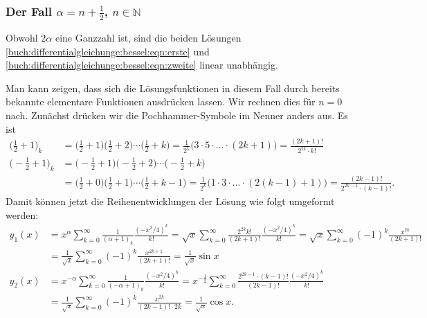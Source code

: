 %
%
\subsubsection{Der Fall $\alpha=n+\frac12$, $n\in\mathbb{N}$}
Obwohl $2\alpha$ eine Ganzzahl ist, sind die beiden Lösungen
\eqref{buch:differentialgleichunge:bessel:eqn:erste}
und
\eqref{buch:differentialgleichunge:bessel:eqn:zweite}
linear unabhängig.

Man kann zeigen, dass sich die Lösungsfunktionen in diesem Fall
durch bereits bekannte elementare Funktionen ausdrücken lassen.
Wir rechnen dies für $n=0$ nach.
Zunächst drücken wir die Pochhammer-Symbole im Nenner anders aus.
Es ist
\begin{align*}
\biggl(\frac12 + 1\biggr)_k
&=
\biggl(\frac12 + 1\biggr)
\biggl(\frac12 + 2\biggr)
\cdots
\biggl(\frac12 + k\biggr)
=
\frac{1}{2^k}\bigl(3\cdot 5\cdot\ldots\cdot (2k+1)\bigr)
=
\frac{(2k+1)!}{2^{2k}\cdot k!}
\\
\biggl(-\frac12 + 1\biggr)_k
&=
\biggl(-\frac12 + 1\biggr)
\biggl(-\frac12 + 2\biggr)
\cdots
\biggl(-\frac12 + k\biggr)
\\
&=
\biggl(\frac12 + 0\biggr)
\biggl(\frac12 + 1\biggr)
\cdots
\biggl(\frac12 + k-1\biggr)
=
\frac{1}{2^k}\bigl(1\cdot 3 \cdot\ldots\cdot (2(k-1)+1)\bigr)
=
\frac{(2k-1)!}{2^{2k-1}\cdot (k-1)!}.
\end{align*}
Damit können jetzt die Reihenentwicklungen der Lösung wie folgt
umgeformt werden:
\begin{align*}
y_1(x)
&=
x^\alpha
\sum_{k=0}^\infty
\frac{1}{(\alpha+1)_k}
\frac{(-x^2/4)^k}{k!}
=
\sqrt{x}
\sum_{k=0}^\infty
\frac{2^{2k}k!}{(2k+1)!}
\frac{(-x^2/4)^k}{k!}
=
\sqrt{x}
\sum_{k=0}^\infty
(-1)^k
\frac{x^{2k}}{(2k+1)!}
\\
&=
\frac{1}{\sqrt{x}}
\sum_{k=0}^\infty
(-1)^k
\frac{x^{2k+1}}{(2k+1)!}
=
\frac{1}{\sqrt{x}} \sin x
\\
y_2(x)
&=
x^{-\alpha}
\sum_{k=0}^\infty
\frac{1}{(-\alpha+1)_k}
\frac{(-x^2/4)^k}{k!}
=
x^{-\frac12}
\sum_{k=0}^\infty
\frac{2^{2k-1}\cdot (k-1)!}{(2k-1)!}
\frac{(-x^2/4)^k}{k!}
\\
&=
\frac{1}{\sqrt{x}}
\sum_{k=0}^\infty
(-1)^k
\frac{x^{2k}}{(2k-1)!\cdot 2k}
=
\frac{1}{\sqrt{x}} \cos x.
\end{align*}

